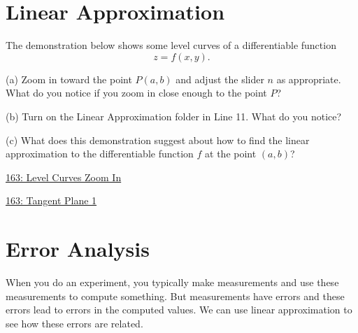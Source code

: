 \documentclass{ximera}
\begin{document}
\section{Linear Approximation}
\begin{exploration}  \label{Ecgnbhyrt}
The demonstration below shows some level curves of a differentiable function
\[
   z = f(x,y) .
\]

(a) Zoom in toward the point $P(a,b)$ and adjust the slider $n$ as appropriate. What do you notice if you zoom in close enough to the point $P$?

(b) Turn on the Linear Approximation folder in Line 11. What do you notice?

(c) What does this demonstration suggest about how to find the linear approximation to the differentiable function $f$ at the point $(a,b)$?


 
\begin{onlineOnly}
    \begin{center}
\end{center}
\end{onlineOnly}


\href{https://www.desmos.com/calculator/8hphbdetoj}{163: Level Curves Zoom In}

\end{exploration}





\begin{exploration} \label{Edfdsf24dfgfsd}
 
\begin{onlineOnly}
    \begin{center}
\end{center}
\end{onlineOnly}


\href{https://www.desmos.com/3d/vmm7nypyuk}{163: Tangent Plane 1}
\end{exploration}




\section{Error Analysis}
When you do an experiment, you typically make measurements and use these measurements to compute something. But measurements have errors and these errors lead to errors in the computed values. We can use linear approximation to see how these errors are related.
\end{document}
